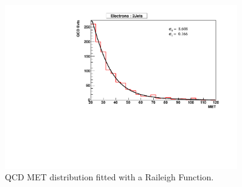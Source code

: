 \begin{figure}[h!] {\centering
{}\linewidth
\includegraphics[width=0.90\textwidth]{plots/qcd/RaileighFitQCD_el2j.pdf}
\caption{QCD MET distribution fitted with a Raileigh Function.}
\label{fig:QCDMETRaileighFit}
}
\end{figure}
